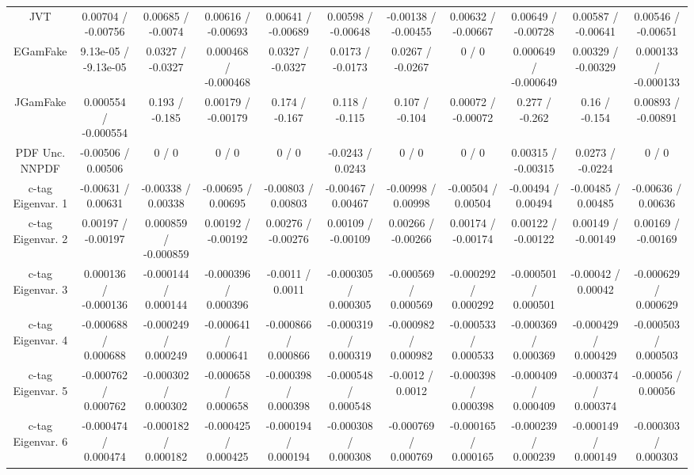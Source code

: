\begin{table}[htbp]
\begin{center}
\begin{tabular}{|c|c|c|c|c|c|c|c|c|c|c|}
  JVT & 0.00704 / -0.00756 & 0.00685 / -0.0074 & 0.00616 / -0.00693 & 0.00641 / -0.00689 & 0.00598 / -0.00648 & -0.00138 / -0.00455 & 0.00632 / -0.00667 & 0.00649 / -0.00728 & 0.00587 / -0.00641 & 0.00546 / -0.00651 \\ 
  EGamFake & 9.13e-05 / -9.13e-05 & 0.0327 / -0.0327 & 0.000468 / -0.000468 & 0.0327 / -0.0327 & 0.0173 / -0.0173 & 0.0267 / -0.0267 & 0 / 0 & 0.000649 / -0.000649 & 0.00329 / -0.00329 & 0.000133 / -0.000133 \\ 
  JGamFake & 0.000554 / -0.000554 & 0.193 / -0.185 & 0.00179 / -0.00179 & 0.174 / -0.167 & 0.118 / -0.115 & 0.107 / -0.104 & 0.00072 / -0.00072 & 0.277 / -0.262 & 0.16 / -0.154 & 0.00893 / -0.00891 \\ 
  PDF Unc. NNPDF & -0.00506 / 0.00506 & 0 / 0 & 0 / 0 & 0 / 0 & -0.0243 / 0.0243 & 0 / 0 & 0 / 0 & 0.00315 / -0.00315 & 0.0273 / -0.0224 & 0 / 0 \\ 
  c-tag Eigenvar. 1 & -0.00631 / 0.00631 & -0.00338 / 0.00338 & -0.00695 / 0.00695 & -0.00803 / 0.00803 & -0.00467 / 0.00467 & -0.00998 / 0.00998 & -0.00504 / 0.00504 & -0.00494 / 0.00494 & -0.00485 / 0.00485 & -0.00636 / 0.00636 \\ 
  c-tag Eigenvar. 2 & 0.00197 / -0.00197 & 0.000859 / -0.000859 & 0.00192 / -0.00192 & 0.00276 / -0.00276 & 0.00109 / -0.00109 & 0.00266 / -0.00266 & 0.00174 / -0.00174 & 0.00122 / -0.00122 & 0.00149 / -0.00149 & 0.00169 / -0.00169 \\ 
  c-tag Eigenvar. 3 & 0.000136 / -0.000136 & -0.000144 / 0.000144 & -0.000396 / 0.000396 & -0.0011 / 0.0011 & -0.000305 / 0.000305 & -0.000569 / 0.000569 & -0.000292 / 0.000292 & -0.000501 / 0.000501 & -0.00042 / 0.00042 & -0.000629 / 0.000629 \\ 
  c-tag Eigenvar. 4 & -0.000688 / 0.000688 & -0.000249 / 0.000249 & -0.000641 / 0.000641 & -0.000866 / 0.000866 & -0.000319 / 0.000319 & -0.000982 / 0.000982 & -0.000533 / 0.000533 & -0.000369 / 0.000369 & -0.000429 / 0.000429 & -0.000503 / 0.000503 \\ 
  c-tag Eigenvar. 5 & -0.000762 / 0.000762 & -0.000302 / 0.000302 & -0.000658 / 0.000658 & -0.000398 / 0.000398 & -0.000548 / 0.000548 & -0.0012 / 0.0012 & -0.000398 / 0.000398 & -0.000409 / 0.000409 & -0.000374 / 0.000374 & -0.00056 / 0.00056 \\ 
  c-tag Eigenvar. 6 & -0.000474 / 0.000474 & -0.000182 / 0.000182 & -0.000425 / 0.000425 & -0.000194 / 0.000194 & -0.000308 / 0.000308 & -0.000769 / 0.000769 & -0.000165 / 0.000165 & -0.000239 / 0.000239 & -0.000149 / 0.000149 & -0.000303 / 0.000303 \\ 

\end{tabular}
\end{center}
\end{table}
